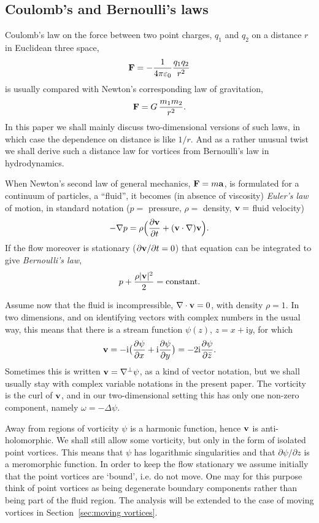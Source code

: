 \documentclass[reqno,12pt]{article}
\theoremstyle{plain}
\theoremstyle{definition}
\numberwithin{equation}{section}
\numberwithin{figure}{section}
\def\I{\mathrm{i}}
\begin{document}
\subsection{Coulomb's and Bernoulli's laws}\label{sec:Bernoulli}

Coulomb's law on the force between two point charges, $q_1$ and $q_2$ on a distance $r$
in Euclidean three space,
$$
{\bf F}=-\frac{1}{4\pi \varepsilon_0}\frac{q_1q_2}{r^2}
$$ 
is usually compared with Newton's corresponding law of gravitation, 
$$
{\bf F}=G\,\frac{m_1m_2}{r^2}.
$$
In this paper we shall mainly discuss two-dimensional versions of such laws, in which case the
dependence on distance is like $1/r$.
And as a rather unusual twist we shall derive such a distance law for vortices
from Bernoulli's law in hydrodynamics.

When Newton's  second law of general mechanics, ${\bf F}=m{\bf a}$, 
is formulated for a continuum of particles, a ``fluid'',  it becomes (in absence of viscosity) {\it Euler's law}
of motion, in standard notation ($p=$ pressure, $\rho=$ density, ${\bf v}=$ fluid velocity)
\begin{equation}\label{Euler}
-\nabla p=\rho \Big(\frac{\partial{\bf v}}{\partial t}+({\bf v}\cdot \nabla){\bf v}\Big).
\end{equation}
If the flow moreover is stationary ($\partial{\bf v}/\partial t=0$) that equation can be integrated  to give {\it Bernoulli's law}, 
\begin{equation}\label{Bernoulli}
p+\frac{\rho|{\bf v}|^2}{2}={\rm constant}. 
\end{equation}

Assume now that the fluid is incompressible, $\nabla\cdot {\bf v}=0$,
with density $\rho=1$. In two dimensions, and on identifying vectors with complex numbers in the usual way,
this means that there is a stream function $\psi(z)$, $z=x+\I y$, for which
\begin{equation}\label{wpsi}
{\bf v}=-\I\big(\frac{\partial \psi}{\partial x}+\I \frac{\partial \psi}{\partial y}\big)=-2\I \frac{\partial \psi}{\partial\bar{z}}.
\end{equation}
Sometimes this is written ${\bf v}=\nabla^{\perp}\psi$, as a kind of vector notation,
but we shall usually stay with complex variable notations in the present paper.
The vorticity is the curl of ${\bf v}$, and in our two-dimensional setting this has only one
non-zero component, namely $\omega=-\Delta \psi$.

Away from regions of vorticity $\psi$ is a harmonic function, hence ${\bf v}$ is anti-holomorphic.
We shall still allow some vorticity, but only in the form of isolated point vortices.
This means that $\psi$ has logarithmic singularities and that $\partial \psi/\partial z$ is a meromorphic function.
In order to keep the flow stationary we assume initially that the point vortices are `bound', i.e. do not move.
One may for this purpose think of point vortices as being degenerate boundary components rather than being
part of the fluid region. The analysis will be extended to the case of moving vortices in Section~\ref{sec:moving vortices}.
\end{document}
